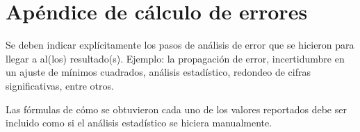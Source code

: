 \documentclass[a4paper, amsfonts, amssymb, amsmath, reprint, showkeys, nofootinbib, twoside]{revtex4-1}
\begin{document}




\nocite{Ejemplo}

\section*{Apéndice de cálculo de errores}

Se deben indicar explícitamente los pasos de análisis de error que se hicieron para llegar a al(los) resultado(s). Ejemplo: la propagación de error, incertidumbre en un ajuste de mínimos cuadrados, análisis estadístico, redondeo de cifras significativas, entre otros.

Las fórmulas de cómo se obtuvieron cada uno de los valores reportados debe ser incluido como si el análisis estadístico se hiciera manualmente.
\end{document}
